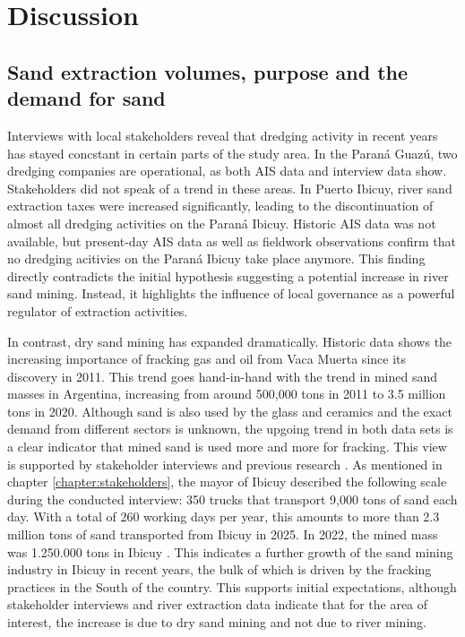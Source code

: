 \chapter{Discussion}

\section{Sand extraction volumes, purpose and the demand for sand}
Interviews with local stakeholders reveal that dredging activity in recent years has stayed concstant in certain parts of the study area. In the Paraná Guazú, two dredging companies are operational, as both AIS data and interview data show. Stakeholders did not speak of a trend in these areas. In Puerto Ibicuy, river sand extraction taxes were increased significantly, leading to the discontinuation of almost all dredging activities on the Paraná Ibicuy. Historic AIS data was not available, but present-day AIS data as well as fieldwork observations confirm that no dredging acitivies on the Paraná Ibicuy take place anymore. This finding directly contradicts the initial hypothesis suggesting a potential increase in river sand mining. Instead, it highlights the influence of local governance as a powerful regulator of extraction activities.

In contrast, dry sand mining has expanded dramatically. Historic data shows the increasing importance of fracking gas and oil from Vaca Muerta since its discovery in 2011. This trend goes hand-in-hand with the trend in mined sand masses in Argentina, increasing from around 500,000 tons in 2011 to 3.5 million tons in 2020. Although sand is also used by the glass and ceramics and the exact demand from different sectors is unknown, the upgoing trend in both data sets is a clear indicator that mined sand is used more and more for fracking. This view is supported by stakeholder interviews and previous research \autocite{fogliaSedArena2023} \autocite{secretariadepoliticamineraArenasParaFracking2019}. As mentioned in chapter \ref{chapter:stakeholders}, the mayor of Ibicuy described the following scale during the conducted interview: 350 trucks that transport 9,000 tons of sand each day. With a total of 260 working days per year, this amounts to more than 2.3 million tons of sand transported from Ibicuy in 2025. In 2022, the mined mass was 1.250.000 tons in Ibicuy \autocite{fogliaSedArena2023}. This indicates a further growth of the sand mining industry in Ibicuy in recent years, the bulk of which is driven by the fracking practices in the South of the country. This supports initial expectations, although stakeholder interviews and river extraction data indicate that for the area of interest, the increase is due to dry sand mining and not due to river mining. 

